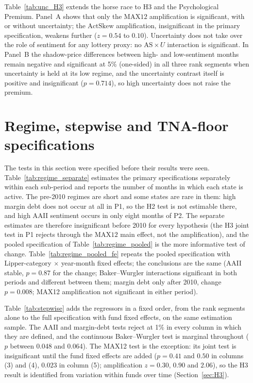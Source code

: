 \documentclass[12pt, oneside]{report}
\begin{document}


\noindent Table~\ref{tab:unc_H3} extends the horse race to H3 and the
Psychological Premium. Panel~A shows that only the $\text{MAX12}$
amplification is significant, with or without uncertainty; the
$\text{ActSkew}$ amplification, insignificant in the primary
specification, weakens further ($z = 0.54$ to $0.10$). Uncertainty does
not take over the role of sentiment for any lottery proxy: no
$\text{AS}\times U$ interaction is significant. In Panel~B the
shadow-price differences between high- and low-sentiment months remain
negative and significant at 5\% (one-sided) in all three rank segments
when uncertainty is held at its low regime, and the uncertainty contrast
itself is positive and insignificant ($p = 0.714$), so high uncertainty
does not raise the premium.

\section{Regime, stepwise and TNA-floor specifications}
\label{sec:a_regime_stepwise}

\noindent The tests in this section were specified before their results
were seen. Table~\ref{tab:regime_separate} estimates the primary
specifications separately within each sub-period and reports the number
of months in which each state is active. The pre-2010 regimes are short
and some states are rare in them: high margin debt does not occur at all
in P1, so the H2 test is not estimable there, and high AAII sentiment
occurs in only eight months of P2. The separate estimates are therefore
insignificant before 2010 for every hypothesis (the H3 joint test in P1
rejects through the $\text{MAX12}$ main effect, not the amplification),
and the pooled specification of
Table~\ref{tab:regime_pooled} is the more informative test of change.
Table~\ref{tab:regime_pooled_fe} repeats the pooled specification with
Lipper-category $\times$ year-month fixed effects; the conclusions are
the same (AAII stable, $p = 0.87$ for the change; Baker--Wurgler
interactions significant in both periods and different between them;
margin debt only after 2010, change $p = 0.008$; MAX12 amplification
not significant in either period).





Table~\ref{tab:stepwise} adds the regressors in a fixed order, from the
rank segments alone to the full specification with fund fixed effects,
on the same estimation sample. The AAII and margin-debt tests reject at
1\% in every column in which they are defined, and the continuous
Baker--Wurgler test is marginal throughout ($p$ between 0.048 and
0.064). The MAX12 test is the exception: its joint test is insignificant
until the fund fixed effects are added ($p = 0.41$ and $0.50$ in
columns (3) and (4), $0.023$ in column (5); amplification $z = 0.30$,
$0.90$ and $2.06$), so the H3 result is
identified from variation within funds over time
(Section~\ref{sec:H3}).
\end{document}
